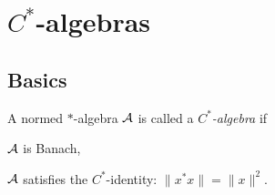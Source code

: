 \documentclass{../note}
\begin{document}





\section{$C^*$-algebras}

\subsection{Basics}



\begin{defn}
A normed $*$-algebra $\mathcal{A}$ is called a \emph{$C^*$-algebra} if
\begin{parts}
\item $\mathcal{A}$ is Banach,
\item $\mathcal{A}$ satisfies the $C^*$-identity: $\|x^*x\|=\|x\|^2$.
\end{parts}
\end{defn}
\end{document}
